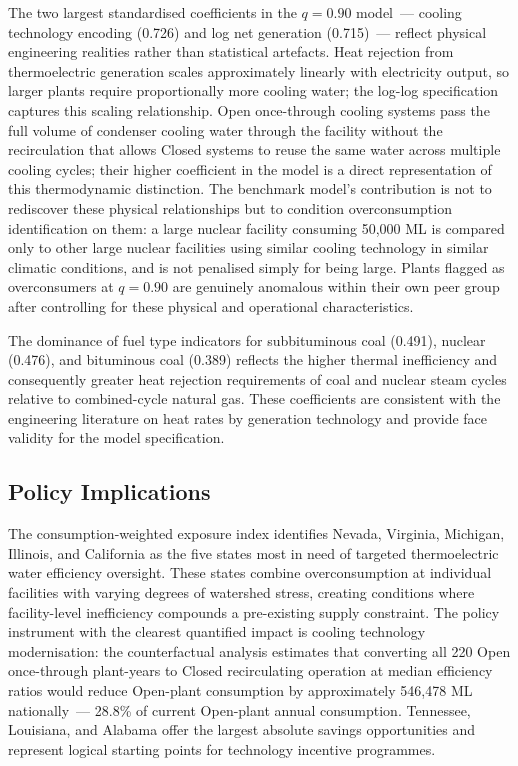 \documentclass[11pt, letterpaper]{article}
\begin{document}
The two largest standardised coefficients in the $q = 0.90$ model~--- cooling technology encoding (0.726) and log net generation (0.715)~--- reflect physical engineering realities rather than statistical artefacts. Heat rejection from thermoelectric generation scales approximately linearly with electricity output, so larger plants require proportionally more cooling water; the log-log specification captures this scaling relationship. Open once-through cooling systems pass the full volume of condenser cooling water through the facility without the recirculation that allows Closed systems to reuse the same water across multiple cooling cycles; their higher coefficient in the model is a direct representation of this thermodynamic distinction. The benchmark model's contribution is not to rediscover these physical relationships but to condition overconsumption identification on them: a large nuclear facility consuming 50{,}000 ML is compared only to other large nuclear facilities using similar cooling technology in similar climatic conditions, and is not penalised simply for being large. Plants flagged as overconsumers at $q = 0.90$ are genuinely anomalous within their own peer group after controlling for these physical and operational characteristics.

The dominance of fuel type indicators for subbituminous coal (0.491), nuclear (0.476), and bituminous coal (0.389) reflects the higher thermal inefficiency and consequently greater heat rejection requirements of coal and nuclear steam cycles relative to combined-cycle natural gas. These coefficients are consistent with the engineering literature on heat rates by generation technology and provide face validity for the model specification.

\subsection{Policy Implications}

The consumption-weighted exposure index identifies Nevada, Virginia, Michigan, Illinois, and California as the five states most in need of targeted thermoelectric water efficiency oversight. These states combine overconsumption at individual facilities with varying degrees of watershed stress, creating conditions where facility-level inefficiency compounds a pre-existing supply constraint. The policy instrument with the clearest quantified impact is cooling technology modernisation: the counterfactual analysis estimates that converting all 220 Open once-through plant-years to Closed recirculating operation at median efficiency ratios would reduce Open-plant consumption by approximately 546{,}478 ML nationally~--- 28.8\% of current Open-plant annual consumption. Tennessee, Louisiana, and Alabama offer the largest absolute savings opportunities and represent logical starting points for technology incentive programmes.
\end{document}
